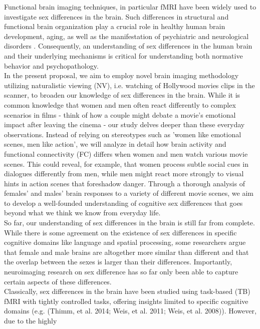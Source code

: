 \documentclass[11pt,a4paper]{article}
\begin{document}
Functional brain imaging techniques, in particular fMRI have been widely used to investigate sex differences in the brain.
Such differences in structural and functional brain organization play a crucial role in healthy human brain development, 
aging, as well as the manifestation of psychiatric and neurological disorders \parencite{cahillWhySexMatters2006a,gobinathSexHormonesGenotype2017a}. 
Consequently, an understanding of sex differences in the human brain and 
their underlying mechanisms is critical for understanding both normative behavior and psychopathology. \\
In the present proposal, we aim to employ novel brain imaging methodology utilizing naturalistic viewing (NV), 
i.e. watching of Hollywood movies clips in the scanner, to broaden our knowledge of sex differences in the brain. 
While it is common knowledge that women and men often react differently to complex scenarios in 
films - think of how a couple might debate a movie's emotional impact after leaving the cinema - our study 
delves deeper than these everyday observations. Instead of relying on stereotypes such as 
'women like emotional scenes, men like action', we will analyze in detail how brain activity and functional 
connectivity (FC) differs when women and men watch various movie scenes. This could reveal, for example, 
that women process subtle social cues in dialogues differently from men, while men might react more strongly to 
visual hints in action scenes that foreshadow danger. Through a thorough analysis of females' and males' brain 
responses to a variety of different movie scenes, we aim to develop a well-founded understanding of cognitive 
sex differences that goes beyond what we think we know from everyday life.\\
So far, our understanding of sex differences in the brain is still far from complete. 
While there is some agreement on the existence of sex differences in specific cognitive domains like 
language and spatial processing, some researchers argue that female and male brains are altogether more similar 
than different \parencite{joelSexGenitaliaHuman2015a} and that the overlap between the sexes is larger than their differences. 
Importantly, neuroimaging research on sex difference has so far only been able to capture certain aspects of these 
differences.\\ 
Classically, sex differences in the brain have been studied using task-based (TB) fMRI with tightly 
controlled tasks, offering insights limited to specific cognitive domains 
(e.g. (Thimm, et al. 2014; Weis, et al. 2011; Weis, et al. 2008)). However, due to the highly 
\end{document}
